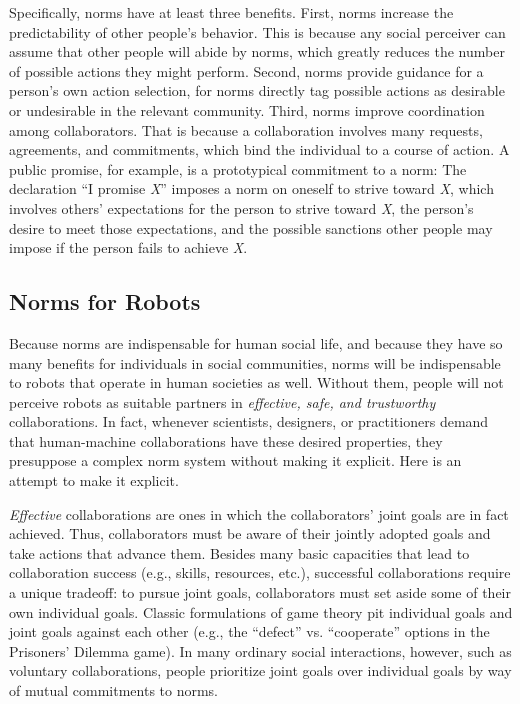 Specifically, norms have at least three benefits.  First, norms
increase the predictability of other people's behavior. This is
because any social perceiver can assume that other people will abide
by norms, which greatly reduces the number of possible actions they
might perform.  Second, norms provide guidance for a person's own
action selection, for norms directly tag possible actions as desirable
or undesirable in the relevant community.  Third, norms improve
coordination among collaborators.  That is because a collaboration
involves many requests, agreements, and commitments, which bind the
individual to a course of action.  A public promise, for example, is a
prototypical commitment to a norm: The declaration ``I promise {\em
  X}'' imposes a norm on oneself to strive toward {\em X}, which
involves others' expectations for the person to strive toward {\em X},
the person's desire to meet those expectations, and the possible
sanctions other people may impose if the person fails to achieve {\em
  X}.


\subsection{Norms for Robots}

\noindent Because norms are indispensable for human social life, and
because they have so many benefits for individuals in social
communities, norms will be indispensable to robots that operate in
human societies as well.  Without them, people will not perceive
robots as suitable partners in {\em effective, safe, and
  trustworthy\/} collaborations.  In fact, whenever scientists,
designers, or practitioners demand that human-machine collaborations
have these desired properties, they presuppose a complex norm system
without making it explicit. Here is an
attempt to make it explicit.

{\em Effective\/} collaborations are ones in which the collaborators'
joint goals are in fact achieved.  Thus, collaborators must be aware
of their jointly adopted goals and take actions that advance them.
Besides many basic capacities that lead to collaboration success
(e.g., skills, resources, etc.), successful collaborations require a
unique tradeoff: to pursue joint goals, collaborators must set aside
some of their own individual goals. Classic formulations of game
theory pit individual goals and joint goals against each other (e.g.,
the ``defect'' vs. ``cooperate'' options in the Prisoners' Dilemma
game). In many ordinary social interactions, however, such as
voluntary collaborations, people prioritize joint goals over
individual goals by way of mutual commitments to norms.

